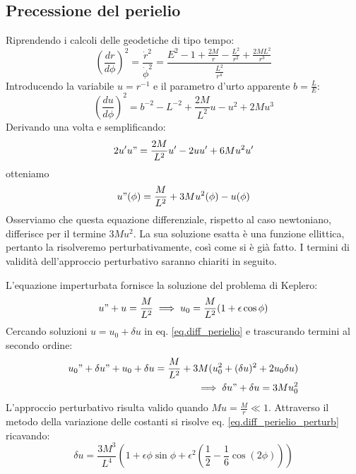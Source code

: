 \subsection{Precessione del perielio}
Riprendendo i calcoli delle geodetiche di tipo tempo:
\begin{equation*}
    \left(\frac{dr}{d\phi}\right)^2 = \frac{\Dot{r}^2}{\dot{\phi}^2} = \frac{E^2 -1 +\frac{2M}{r} - \frac{L^2}{r^2} + \frac{2ML^2}{r^3}}{\frac{L^2}{r^4}}
\end{equation*}
Introducendo la variabile $u=r^{-1}$ e il parametro d'urto apparente $b = \frac{L}{E}$:
\begin{equation*}
    \left(\frac{du}{d\phi}\right)^2 = b^{-2} - L^{-2} + \frac{2M}{L^2}u - u^2 +2Mu^3 
\end{equation*}
Derivando una volta e semplificando:
\begin{equation*}
    2u'u" = \frac{2M}{L^2} u' - 2u u' +6Mu^2u'
\end{equation*}
otteniamo
\begin{equation}
    u"(\phi) = \frac{M}{L^2} +3Mu^2(\phi) - u(\phi)
    \label{eq.diff_perielio}
\end{equation}
Osserviamo che questa equazione differenziale, rispetto al caso newtoniano, differisce per il termine $3Mu^2$. La sua soluzione esatta è una funzione ellittica, pertanto la risolveremo perturbativamente, così come si è già fatto. I termini di validità dell'approccio perturbativo saranno chiariti in seguito. 

L'equazione imperturbata fornisce la soluzione del problema di Keplero:
\begin{equation}
    u" +u = \frac{M}{L^2} \implies u_0 = \frac{M}{L^2} (1+\epsilon\cos\phi)
    \label{eq.imperturbata_keplero}
\end{equation}
Cercando soluzioni $u= u_0 + \delta u$ in eq. \ref{eq.diff_perielio} e trascurando termini al secondo ordine:
\begin{align}
    u_0" +\delta u" + u_0 + \delta u = \frac{M}{L^2} + 3M(u_0^2+ (\delta u)^2 +2u_0 \delta u) \nonumber \\
    \implies \delta u" + \delta u = 3M u_0^2
    \label{eq.diff_perielio_perturb}
\end{align}
L'approccio perturbativo risulta valido quando $Mu = \frac{M}{r} \ll 1$. Attraverso il metodo della variazione delle costanti si risolve eq. \ref{eq.diff_perielio_perturb} ricavando:
\begin{equation}
    \delta u = \frac{3M^3}{L^4}\left(1 + \epsilon \phi \sin \phi + \epsilon^2(\frac{1}{2} -\frac{1}{6}\cos(2\phi) )\right)
\end{equation}

